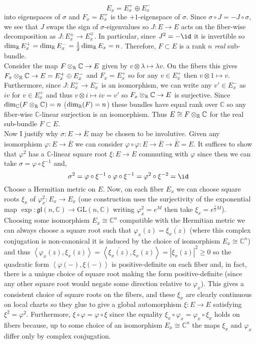 \documentclass[12pt]{extarticle}
\newcommand{\C}{\mathbb{C}}
\begin{document}
\[ E_{x} = E_{x}^+ \oplus E_{x}^{-} \]
into eigenspaces of $\sigma$ and $F_x = E_{x}^{+}$ is the $+1$-eigenspace of $\sigma$. Since $\sigma \circ J = - J \circ \sigma$, we see that $J$ swaps the sign of $\sigma$-eigenvalues so $J : E \to E$ acts on the fiber-wise decomposition as $J : E_x^{\pm} \to E_x^{\mp}$. In particular, since $J^2 = -\id$ it is invertible so $\dim_{\mathbb{R}}{E_x^{+}} = \dim_{\mathbb{R}}{E_x^{-}} = \tfrac{1}{2} \dim_{\mathbb{R}}{E_x} = n$. Therefore, $F \subset E$ is a rank $n$ \textit{real} sub-bundle.
\bigskip\\
Consider the map $F \otimes_\R \C \to E$ given by $v \otimes \lambda \mapsto \lambda v$. On the fibers this gives $F_x \otimes_\R \C \to E = E_x^{+} \oplus E_x^{-}$ and $F_x = E_x^{+}$ so for any $v \in E_x^{+}$ then $v \otimes 1 \mapsto v$. Furthermore, since $J : E_{x}^{+} \to E_{x}^{-}$ is an isomorphism, we can write any $v' \in E_x^{-}$ as $i v$ for $v \in E_x^{+}$ and thus $v \otimes i \mapsto i v = v'$ so $F_x \otimes_\R \C \to E$ is surjective. Since $\dim_{\C}(F \otimes_\R \C) = n$ ($\dim_{\mathbb{R}}(F) = n$) these bundles have equal rank over $\C$ so any fiber-wise $\C$-linear surjection is an isomorphism. Thus $E \cong F \otimes_\R \C$ for the real sub-bundle $F \subset E$. 
\bigskip\\
Now I justify why $\sigma : E \to \overline{E}$ may be chosen to be involutive. Given any isomorphism $\varphi : E \to \overline{E}$ we can consider $\varphi \circ \varphi : E \to \overline{E} \to \overline{\overline{E}} = E$. It suffices to show that $\varphi^2$ has a $\C$-linear square root $\xi : E \to E$ commuting with $\varphi$ since then we can take $\sigma = \varphi \circ \xi^{-1}$ and,
\[ \sigma^2 = \varphi \circ \xi^{-1} \circ \varphi \circ \xi^{-1} = \varphi^2 \circ \xi^{-2} = \id \]
Choose a Hermitian metric on $E$. Now, on each fiber $E_x$ we can choose square roots $\xi_x$ of $\varphi_x^2 : E_x \to E_x$ (one construction uses the surjectivity of the exponential map $\exp : \mathfrak{gl}(n, \C) \to \mathrm{GL}(n, \C)$ writing $\varphi_x^2 = e^{M}$ then take $\xi_x = e^{\tfrac{1}{2} M}$). Choosing some isomorphism $E_x \cong \C^n$ compatible with the Hermitian metric we can always choose a square root such that $\varphi_x(z) = \overline{\xi_x(z)}$ (where this complex conjugation is non-canonical it is induced by the choice of  isomorphism $E_x \cong \C^n$) and thus $\left< \varphi_x(z), \xi_x(z) \right> = \left< \overline{\xi_x(z)}, \xi_x(z) \right> = |\xi_x(z)|^2 \ge 0$ so the quadratic form $\left< \varphi(-), \xi(-) \right>$ is positive-definite on each fiber and, in fact, there is a unique choice of square root making the form positive-definite (since any other square root would negate some direction relative to $\varphi_x$). This gives a consistent choice of square roots on the fibers, and these $\xi_x$ are clearly continuous on local charts so they glue to give a global automorphism $\xi : E \to E$ satisfying $\xi^2 = \varphi^2$. Furthermore, $\xi \circ \varphi = \varphi \circ \xi$ since the equality $\xi_x \circ \varphi_x = \varphi_x \circ \xi_x$ holds on fibers because, up to some choice of an isomorphism $E_x \cong \C^n$ the maps $\xi_x$ and $\varphi_x$ differ only by complex conjugation. 
\end{document}
